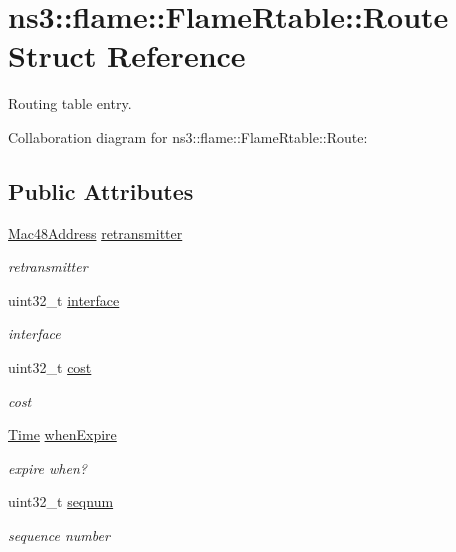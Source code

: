 \hypertarget{structns3_1_1flame_1_1FlameRtable_1_1Route}{}\section{ns3\+:\+:flame\+:\+:Flame\+Rtable\+:\+:Route Struct Reference}
\label{structns3_1_1flame_1_1FlameRtable_1_1Route}


Routing table entry.  




Collaboration diagram for ns3\+:\+:flame\+:\+:Flame\+Rtable\+:\+:Route\+:
\subsection*{Public Attributes}
\begin{DoxyCompactItemize}
\item 
\hyperlink{classns3_1_1Mac48Address}{Mac48\+Address} \hyperlink{structns3_1_1flame_1_1FlameRtable_1_1Route_aa18df940013826b9e1738b822127f25f}{retransmitter}
\begin{DoxyCompactList}\small\item\em retransmitter \end{DoxyCompactList}\item 
uint32\+\_\+t \hyperlink{structns3_1_1flame_1_1FlameRtable_1_1Route_af97b1bb4254176a2f495b34b7c26fc46}{interface}
\begin{DoxyCompactList}\small\item\em interface \end{DoxyCompactList}\item 
uint32\+\_\+t \hyperlink{structns3_1_1flame_1_1FlameRtable_1_1Route_ad63929825f970a3816847f76856c5979}{cost}
\begin{DoxyCompactList}\small\item\em cost \end{DoxyCompactList}\item 
\hyperlink{classns3_1_1Time}{Time} \hyperlink{structns3_1_1flame_1_1FlameRtable_1_1Route_a3d66f8911652a87df41d83dececcbf5d}{when\+Expire}
\begin{DoxyCompactList}\small\item\em expire when? \end{DoxyCompactList}\item 
uint32\+\_\+t \hyperlink{structns3_1_1flame_1_1FlameRtable_1_1Route_a18f83d34a8719ce12569448105ad8ef0}{seqnum}
\begin{DoxyCompactList}\small\item\em sequence number \end{DoxyCompactList}\end{DoxyCompactItemize}


